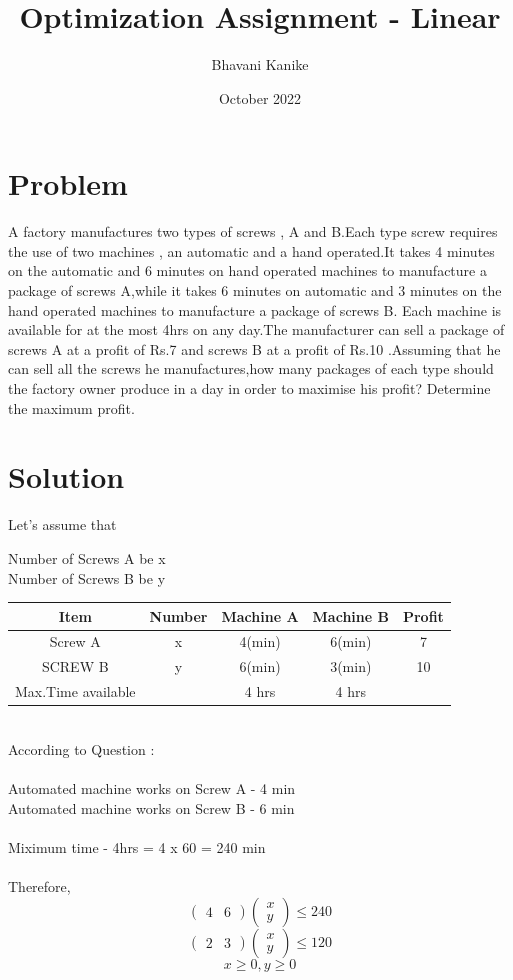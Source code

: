 \documentclass[journal,10pt]{article}
\title{\textbf{Optimization Assignment - Linear}}
\author{Bhavani Kanike}
\date{October 2022}
\newcommand{\myvec}[1]{\ensuremath{\begin{pmatrix}#1\end{pmatrix}}}
\begin{document}
\maketitle


\section*{Problem}A factory manufactures two types of screws , A and B.Each type screw requires the use of two machines , an automatic and a hand operated.It takes 4 minutes on the automatic and 6 minutes on hand operated machines to manufacture a package of screws A,while it takes 6 minutes on automatic and 3 minutes on the hand operated machines to manufacture a package of screws B. Each machine is available for at the most 4hrs on any day.The manufacturer can sell a package of screws A at a profit of Rs.7 and screws B at a profit of Rs.10 .Assuming that he can sell all the screws he manufactures,how many packages of each type should the factory owner produce in a day in order to maximise his profit? Determine the maximum profit.

\section*{Solution}
Let's assume that
\begin{center}
Number of Screws A be x\\
Number of Screws B be y\\
\end{center}
\begin{tabular}{|c|c|c|c|c|}
	\hline
	\textbf{Item}&\textbf{Number}&\textbf{Machine A}&\textbf{Machine B}&\textbf{Profit}\\
	\hline
	Screw A&x&4(min)&6(min)&7\\
	\hline
	SCREW B&y&6(min)&3(min)&10\\
	\hline
	Max.Time available& &4 hrs&4 hrs&\\
	\hline
\end{tabular}\\

According to Question : \\\\
Automated machine works on Screw A - 4 min\\
Automated machine works on Screw B - 6 min\\\\
Miximum time - 4hrs = 4 x 60 = 240 min\\\\
Therefore,
\begin{equation}
	\myvec{4 &6}\myvec{x\\y} \leq 240
\end{equation}
\begin{equation}
	\myvec{2&3} \myvec{x\\y} \leq 120	
\end{equation}
\begin{equation}
	x \geq 0 , y \geq 0
\end{equation}
\end{document}

